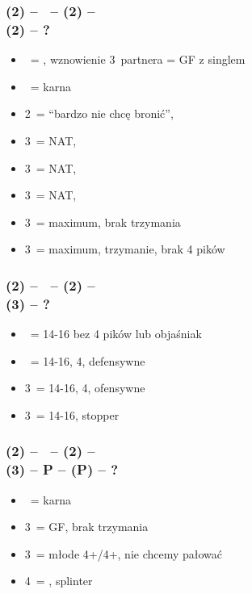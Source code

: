 \documentclass[12pt, a4paper]{article}
\begin{document}
\subsubsection*{(2\diams) -- \dbl\ -- (2\hearts) -- \dbl \\ (2\spades) -- ?}
\begin{itemize}
    \item \pass\ = \fonce, wznowienie 3\spades\ partnera = GF z singlem \spades
    \item \dbl\ = karna
    \item 2\nt\ = ``bardzo nie chcę bronić'', \gf
    \item 3\clubs\ = NAT, \gf
    \item 3\diams\ = NAT, \gf
    \item 3\hearts\ = NAT, \gf
    \item 3\spades\ = maximum, brak trzymania
    \item 3\nt\ = maximum, trzymanie, brak 4 pików
\end{itemize}

\subsubsection*{(2\diams) -- \dbl\ -- (2\spades) -- \dbl \\ (3\hearts) -- ?}
\begin{itemize}
    \item \pass\ = 14-16 bez 4 pików lub objaśniak \fonce
    \item \dbl\ = 14-16, 4\spades, defensywne
    \item 3\spades\ = 14-16, 4\spades, ofensywne
    \item 3\nt\ = 14-16, stopper
\end{itemize}

\subsubsection*{(2\diams) -- \dbl\ -- (2\spades) -- \dbl \\ (3\hearts) -- P -- (P) -- ?}
\begin{itemize}
    \item \dbl\ = karna
    \item 3\spades\ = GF, brak trzymania \hearts
    \item 3\nt\ = młode 4+/4+, nie chcemy pałować
    \item 4\hearts\ = \gf, splinter \hearts
\end{itemize}
\end{document}
